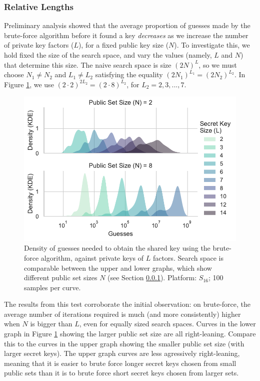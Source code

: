 \subsubsection{Relative Lengths}\label{sec:eval-relative-lengths}

Preliminary analysis showed that the average proportion of guesses made by the brute-force algorithm before it found a key \textit{decreases} as we increase the number of private key factors ($L$), for a fixed public key size ($N$). To investigate this, we hold fixed the size of the search space, and vary the values (namely, $L$ and $N$) that determine this size. The naive search space is size $(2N)^L$, so we must choose $N_1 \neq N_2$ and $L_1 \neq L_2$ satisfying the equality $(2N_1)^{L_1} = (2N_2)^{L_2}$. In Figure \ref{fig:fix-keyspace}, we use $(2 \cdot 2)^{2 L_2} = (2 \cdot 8)^{L_2}$, for $L_2 = 2, 3, ..., 7$.

\begin{figure}[hbt]
  \includegraphics[width=\columnwidth]{images/constant-key-space.pdf}
  \caption{Density of guesses needed to obtain the shared key using the brute-force algorithm, against private keys of $L$ factors. Search space is comparable between the upper and lower graphs, which show different public set sizes $N$ (see Section \ref{sec:eval-relative-lengths}). Platform: $S_{16}$; 100 samples per curve.}
  \label{fig:fix-keyspace}
\end{figure}

The results from this test corroborate the initial observation: on brute-force, the average number of iterations required is much (and more consistently) higher when $N$ is bigger than $L$, even for equally sized search spaces. Curves in the lower graph in Figure \ref{fig:fix-keyspace} showing the larger public set size are all right-leaning. Compare this to the curves in the upper graph showing the smaller public set size (with larger secret keys). The upper graph curves are less agressively right-leaning, meaning that it is easier to brute force longer secret keys chosen from small public sets than it is to brute force short secret keys chosen from larger sets. 

